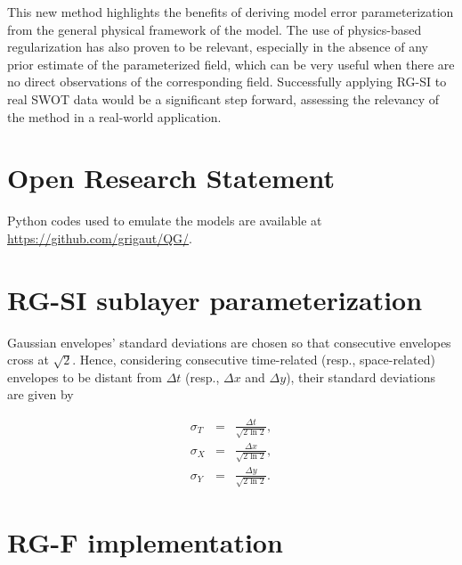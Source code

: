 \documentclass[
  draft
]{agujournal2025}
\begin{document}
This new method highlights the benefits of deriving model error parameterization from the general physical framework of the model. The use of physics-based regularization has also proven to be relevant, especially in the absence of any prior estimate of the parameterized field, which can be very useful when there are no direct observations of the corresponding field. Successfully applying RG-SI to real SWOT data would be a significant step forward, assessing the relevancy of the method in a real-world application.


\section*{Open Research Statement}

Python codes used to emulate the models are available at \url{https://github.com/grigaut/QG/}.



%



\appendix  %

\section{RG-SI sublayer parameterization}\label{appendix:rg-si-parameterization}

Gaussian envelopes' standard deviations are chosen so that consecutive envelopes cross at $\sqrt{2}$. Hence, considering consecutive time-related (resp., space-related) envelopes to be distant from $\Delta t$ (resp., $\Delta x$ and $\Delta y$), their standard deviations are given by

\begin{eqnarray}
        \sigma_T & = & \frac{\Delta t}{\sqrt{2\ln{2}}}, \\
        \sigma_X & = & \frac{\Delta x}{\sqrt{2\ln{2}}}, \\
        \sigma_Y & = & \frac{\Delta y}{\sqrt{2\ln{2}}}.
\end{eqnarray}

\section{RG-F implementation}\label{appendix:rg-f-implementation}
\end{document}
